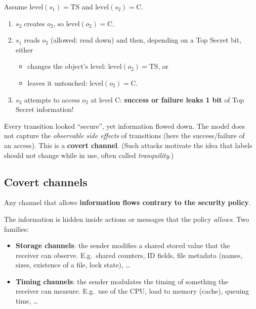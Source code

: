 \begin{example}
Assume $\text{level}(s_1) = \text{TS}$ and $\text{level}(s_2) = \text{C}$.
\begin{enumerate}
    \item $s_2$ creates $o_2$, so $\text{level}(o_2) = \text{C}$.
    \item $s_1$ reads $o_2$ (allowed: read down) and then, depending on a Top Secret bit, either
    \begin{itemize}
        \item changes the object's level: $\text{level}(o_2) = \text{TS}$, or
        \item leaves it untouched: $\text{level}(o_2) = \text{C}$.
    \end{itemize}
    \item $s_2$ attempts to access $o_2$ at level C: \textbf{success or failure leaks 1 bit} of Top Secret information!
\end{enumerate}
Every transition looked ``secure'', yet information flowed down. The model does not capture the \emph{observable side effects} of transitions (here the success/failure of an access). This is a \textbf{covert channel}. (Such attacks motivate the idea that labels should not change while in use, often called \emph{tranquility}.)
\end{example}

\subsection{Covert channels}

\begin{definition}
Any channel that allows \textbf{information flows contrary to the security policy}.
\end{definition}

The information is hidden inside actions or messages that the policy \emph{allows}. Two families:
\begin{itemize}
    \item \textbf{Storage channels}: the sender modifies a shared stored value that the receiver can observe. E.g.\ shared counters, ID fields, file metadata (names, sizes, existence of a file, lock state), \dots
    \item \textbf{Timing channels}: the sender modulates the timing of something the receiver can measure. E.g.\ use of the CPU, load to memory (cache), queuing time, \dots
\end{itemize}

